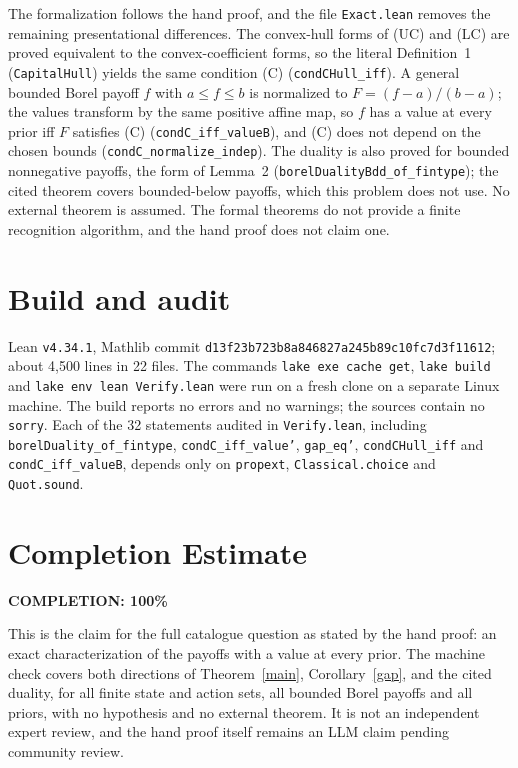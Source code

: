 \documentclass[11pt]{article}
\theoremstyle{definition}
\begin{document}
The formalization follows the hand proof, and the file \texttt{Exact.lean} removes the remaining presentational differences. The convex-hull forms of (UC) and (LC) are proved equivalent to the convex-coefficient forms, so the literal Definition~1 (\texttt{CapitalHull}) yields the same condition (C) (\texttt{condCHull\_iff}). A general bounded Borel payoff $f$ with $a\le f\le b$ is normalized to $F=(f-a)/(b-a)$; the values transform by the same positive affine map, so $f$ has a value at every prior iff $F$ satisfies (C) (\texttt{condC\_iff\_valueB}), and (C) does not depend on the chosen bounds (\texttt{condC\_normalize\_indep}). The duality is also proved for bounded nonnegative payoffs, the form of Lemma~2 (\texttt{borelDualityBdd\_of\_fintype}); the cited theorem covers bounded-below payoffs, which this problem does not use. No external theorem is assumed. The formal theorems do not provide a finite recognition algorithm, and the hand proof does not claim one.

\section{Build and audit}

Lean \texttt{v4.34.1}, Mathlib commit \texttt{d13f23b723b8a846827a245b89c10fc7d3f11612}; about 4,500 lines in 22 files. The commands \texttt{lake exe cache get}, \texttt{lake build} and \texttt{lake env lean Verify.lean} were run on a fresh clone on a separate Linux machine. The build reports no errors and no warnings; the sources contain no \texttt{sorry}. Each of the 32 statements audited in \texttt{Verify.lean}, including \texttt{borelDuality\_of\_fintype}, \texttt{condC\_iff\_value'}, \texttt{gap\_eq'}, \texttt{condCHull\_iff} and \texttt{condC\_iff\_valueB}, depends only on \texttt{propext}, \texttt{Classical.choice} and \texttt{Quot.sound}.

\section{Completion Estimate}
\noindent\textbf{COMPLETION: 100\%}

This is the claim for the full catalogue question as stated by the hand proof: an exact characterization of the payoffs with a value at every prior. The machine check covers both directions of Theorem~\ref{main}, Corollary~\ref{gap}, and the cited duality, for all finite state and action sets, all bounded Borel payoffs and all priors, with no hypothesis and no external theorem. It is not an independent expert review, and the hand proof itself remains an LLM claim pending community review.
\end{document}
